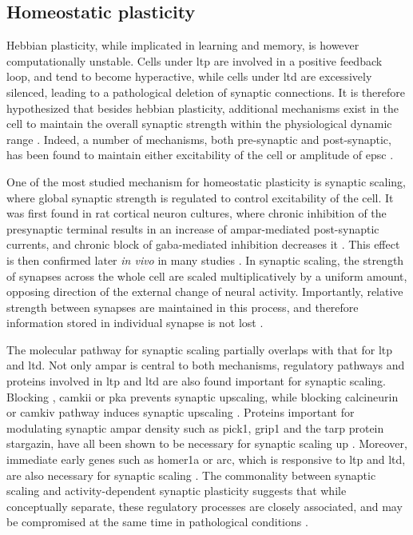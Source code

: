 \subsection{Homeostatic plasticity}
Hebbian plasticity, while implicated in learning and memory, is however computationally unstable. Cells under \gls{ltp} are involved in a positive feedback loop, and tend to become hyperactive, while cells under \gls{ltd} are excessively silenced, leading to a pathological deletion of synaptic connections. It is therefore hypothesized that besides hebbian plasticity, additional mechanisms exist in the cell to maintain the overall synaptic strength within the physiological dynamic range \citep{bienenstock82, cooper12}. Indeed, a number of mechanisms, both pre-synaptic and post-synaptic, has been found to maintain either excitability of the cell or amplitude of \gls{epsc} \citep{turrigiano98, frank06, collingridge10, chater14, wang16}. 

One of the most studied mechanism for homeostatic plasticity is synaptic scaling, where global synaptic strength is regulated to control excitability of the cell. It was first found in rat cortical neuron cultures, where chronic inhibition of the presynaptic terminal results in an increase of \gls{ampar}-mediated post-synaptic currents, and chronic block of \gls{gaba}-mediated inhibition decreases it \citep{turrigiano98}. This effect is then confirmed later \textit{in vivo} in many studies \citep{whitt14}. In synaptic scaling, the strength of synapses across the whole cell are scaled multiplicatively by a uniform amount, opposing direction of the external change of neural activity. Importantly, relative strength between synapses are maintained in this process, and therefore information stored in individual synapse is not lost \citep{turrigiano08}. 

The molecular pathway for synaptic scaling partially overlaps with that for \gls{ltp} and \gls{ltd}. Not only \gls{ampar} is central to both mechanisms, regulatory pathways and proteins involved in \gls{ltp} and \gls{ltd} are also found important for synaptic scaling. Blocking , \gls{camkii} or \gls{pka} prevents synaptic upscaling, while blocking calcineurin or \gls{camkiv} pathway induces synaptic upscaling \citep{goel11, kim14, ibata08}. Proteins important for modulating synaptic \gls{ampar} density such as \gls{pick1}, \gls{grip1} and the \gls{tarp} protein stargazin, have all been shown to be necessary for synaptic scaling up \citep{anggono11, gainey15, louros14}. Moreover, immediate early genes such as homer1a or \gls{arc}, which is responsive to \gls{ltp} and \gls{ltd}, are also necessary for synaptic scaling \citep{hu10, gao10}. The commonality between synaptic scaling and activity-dependent synaptic plasticity suggests that while conceptually separate, these regulatory processes are closely associated, and may be compromised at the same time in pathological conditions \citep{fernandes16}.


